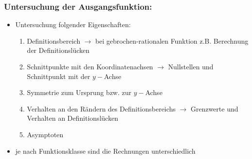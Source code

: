 \documentclass[a4paper,twocolumn,10pt]{onepgnote1}
\begin{document}
 \subsubsection{Untersuchung der Ausgangsfunktion:}
 \begin{itemize}
     \item Untersuchung folgender Eigenschaften:\\
     \begin{enumerate}
         \item Definitionsbereich $\longrightarrow$ bei gebrochen-rationalen Funktion z.B. Berechnung der Definitionslücken\\
         \item Schnittpunkte mit den Koordinatenachsen $\longrightarrow$ Nullstellen und Schnittpunkt mit der $y-$Achse\\
         \item Symmetrie zum Ursprung bzw. zur $y-$Achse\\
         \item Verhalten an den Rändern des Definitionsbereichs $\longrightarrow$ Grenzwerte und Verhalten an Definitionslücken\\
         \item Asymptoten
     \end{enumerate}
     \item je nach Funktionsklasse sind die Rechnungen unterschiedlich
 \end{itemize}
\end{document}
